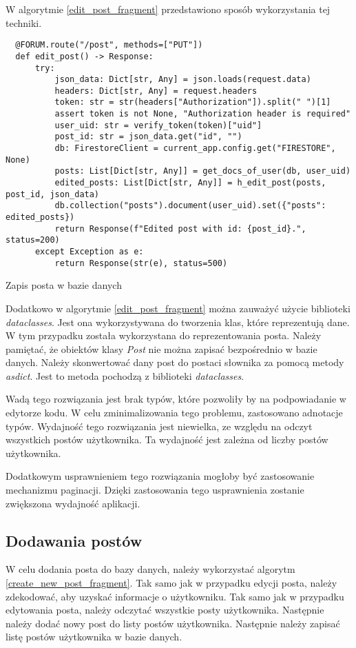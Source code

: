 W algorytmie \ref{edit_post_fragment} przedstawiono sposób wykorzystania tej techniki.

\begin{code}[H]
  \begin{verbatim}
  @FORUM.route("/post", methods=["PUT"])
  def edit_post() -> Response:
      try:
          json_data: Dict[str, Any] = json.loads(request.data)
          headers: Dict[str, Any] = request.headers
          token: str = str(headers["Authorization"]).split(" ")[1]
          assert token is not None, "Authorization header is required"
          user_uid: str = verify_token(token)["uid"]
          post_id: str = json_data.get("id", "")
          db: FirestoreClient = current_app.config.get("FIRESTORE", None)
          posts: List[Dict[str, Any]] = get_docs_of_user(db, user_uid)
          edited_posts: List[Dict[str, Any]] = h_edit_post(posts, post_id, json_data)
          db.collection("posts").document(user_uid).set({"posts": edited_posts})
          return Response(f"Edited post with id: {post_id}.", status=200)
      except Exception as e:
          return Response(str(e), status=500)
  \end{verbatim}
  \caption{Zapis posta w bazie danych}
  \label{edit_post_fragment}
\end{code}

Dodatkowo w algorytmie \ref{edit_post_fragment} można zauważyć użycie biblioteki \textit{dataclasses}. Jest ona wykorzystywana do tworzenia klas, które reprezentują dane. W tym przypadku została wykorzystana do reprezentowania posta. Należy pamiętać, że obiektów klasy \textit{Post} nie można zapisać bezpośrednio w bazie danych. Należy skonwertować dany post do postaci słownika za pomocą metody \textit{asdict}. Jest to metoda pochodzą z biblioteki \textit{dataclasses}.

Wadą tego rozwiązania jest brak typów, które pozwoliły by na podpowiadanie w edytorze kodu. W celu zminimalizowania tego problemu, zastosowano adnotacje typów. Wydajność tego rozwiązania jest niewielka, ze względu na odczyt wszystkich postów użytkownika. Ta wydajność jest zależna od liczby postów użytkownika. 

Dodatkowym usprawnieniem tego rozwiązania mogłoby być zastosowanie mechanizmu paginacji. Dzięki zastosowania tego usprawnienia zostanie zwiększona wydajność aplikacji. 

\subsection{Dodawania postów}
W celu dodania posta do bazy danych, należy wykorzystać algorytm \ref{create_new_post_fragment}. Tak samo jak w przypadku edycji posta, należy zdekodować, aby uzyskać informacje o użytkowniku. Tak samo jak w przypadku edytowania posta, należy odczytać wszystkie posty użytkownika. Następnie należy dodać nowy post do listy postów użytkownika. Następnie należy zapisać listę postów użytkownika w bazie danych.


